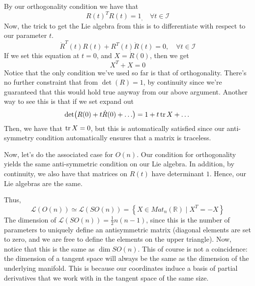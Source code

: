By our orthogonality condition we have that
\[
R ( t) ^ T R( t)  = 1_, \quad \forall t \in \mathcal{ I }
\] Now, the trick to get the Lie algebra from this is
to differentiate with respect to our parameter $ t$. 
\[
\dot { R} ^ T ( t) R( t) + R^ T ( t) \dot{ R} ( t)  =0, \quad  \forall t \in \mathcal{ I }
\] If we set this equation at $ t = 0 $, and $ X = \dot{ R} ( 0 )  $, then we get
\[
X^ T + X = 0 
\] Notice that the only condition 
we've used so far is that of orthogonality. There's no further constraint that from $ \det ( R) = 1$, 
by continuity since we're guaranteed that this would hold true anyway from our above argument. 
Another way to see this is that if we set expand out 
\[
	\det ( R( 0) + t \dot{ R  } ( 0 ) + \dots )  = 1 + t  \tr X  + \dots 
\] Then, we have that $ \tr X  = 0 $, but this is automatically 
satisfied since our anti-symmetry condition automatically ensures 
that a matrix is traceless. 

Now, let's do the associated case for $ O ( n ) $. 
Our condition for orthogonality yields 
the same anti-symmetric condition on our Lie algebra. In addition, 
by continuity, we also have that matrices on  $ R ( t) $ have determinant $ 1 $. 
Hence, our Lie algebras are the same. 

Thus, 
\[
	\mathcal{ L } ( O ( n ) ) \simeq \mathcal{L }( SO ( n ) )  = \left\{ X \in Mat_n ( \mathbb{ R} ) \mid X^T =  - X \right\} 
\] The dimension of $ \mathcal{ L } ( SO ( n ) )  = \frac{1}{2 } n ( n - 1) 	$, since this is the number of parameters to uniquely define an antisymmetric matrix (diagonal elements are set to zero, and we are free to define the elements on the upper triangle). Now, notice that this is the 
same as $ \dim SO ( n ) $. This of course is not a coincidence: the dimension of a tangent space will
always be the same as the dimension of the underlying manifold. 
This is because our coordinates induce a basis of partial derivatives
that we work with in the tangent space of the same size. 

